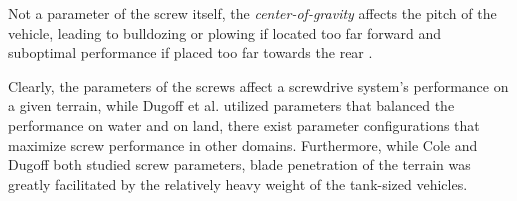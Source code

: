 
Not a parameter of the screw itself, the \emph{center-of-gravity} affects the pitch of the vehicle, leading to bulldozing or plowing if located too far forward and suboptimal performance if placed too far towards the rear \cite{Dugoff1967, Nagaoka2011}. 


Clearly, the parameters of the screws affect a screwdrive system's performance on a given terrain, while Dugoff et al. \cite{Dugoff1967} utilized parameters that balanced the performance on water and on land, there exist parameter configurations that maximize screw performance in other domains. Furthermore, while Cole \cite{Cole1961} and Dugoff \cite{Dugoff1967} both studied screw parameters, blade penetration of the terrain was greatly facilitated by the relatively heavy weight of the tank-sized vehicles. %

